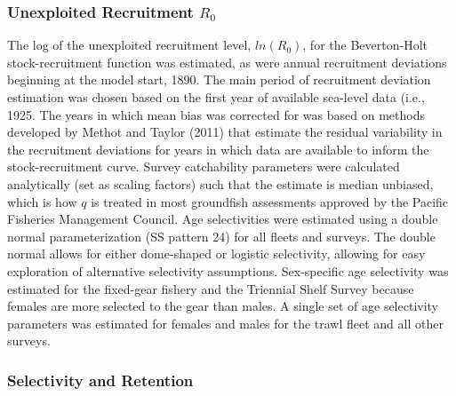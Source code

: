\documentclass[11pt,
  english,
  a4paper,
]{article}
\begin{document}

\hypertarget{unexploited-recruitment-r_0}{%
\subsubsection{\texorpdfstring{Unexploited Recruitment {\(R_0\)\leavevmode\tagmcend\tagstructend}}{Unexploited Recruitment R\_0}}\label{unexploited-recruitment-r_0}}

\leavevmode\tagmcend\tagstructend


The log of the unexploited recruitment level, {\(ln(R_0)\)\leavevmode\tagmcend\tagstructend}, for the Beverton-Holt stock-recruitment function was estimated, as were annual recruitment deviations beginning at the model start, 1890. The main period of recruitment deviation estimation was chosen based on the first year of available sea-level data (i.e., 1925. The years in which mean bias was corrected for was based on methods developed by {Methot and Taylor (2011)\leavevmode\tagmcend\tagstructend} that estimate the residual variability in the recruitment deviations for years in which data are available to inform the stock-recruitment curve. Survey catchability parameters were calculated analytically (set as scaling factors) such that the estimate is median unbiased, which is how {\(q\)\leavevmode\tagmcend\tagstructend} is treated in most groundfish assessments approved by the Pacific Fisheries Management Council. Age selectivities were estimated using a double normal parameterization (SS pattern 24) for all fleets and surveys. The double normal allows for either dome-shaped or logistic selectivity, allowing for easy exploration of alternative selectivity assumptions. Sex-specific age selectivity was estimated for the fixed-gear fishery and the Triennial Shelf Survey because females are more selected to the gear than males. A single set of age selectivity parameters was estimated for females and males for the trawl fleet and all other surveys.

\leavevmode\tagmcend\tagstructend\par


\hypertarget{selectivity-and-retention}{%
\subsubsection{Selectivity and Retention}\label{selectivity-and-retention}}
\end{document}
